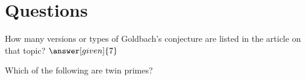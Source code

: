 \documentclass[nooutcomes]{ximera}
\begin{document}
\section{Questions}

\begin{question}
How many versions or types of Goldbach's conjecture are listed in the article on that topic?
$\answer[given]{7}$
\end{question}

\begin{question}
Which of the following are twin primes?
\begin{multipleChoice}
\end{multipleChoice}
\end{question}


%
\end{document}
